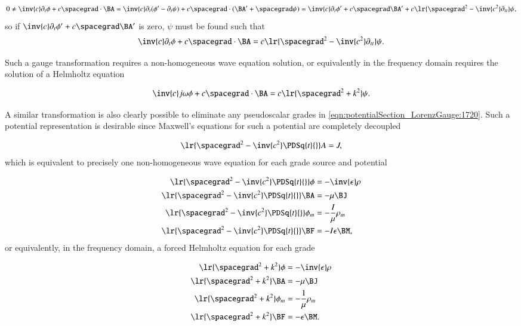 \begin{dmath}\label{eqn:potentialSection_LorenzGauge:1680}
0 \ne
\inv{c} \partial_t \phi + c \spacegrad \cdot \BA
=
\inv{c} \partial_t (\phi' - \partial_t \psi) + c \spacegrad \cdot (\BA' + \spacegrad \psi)
=
\inv{c} \partial_t \phi' + c \spacegrad \BA'
+ c \lr{ \spacegrad^2 - \inv{c^2} \partial_{tt} } \psi,
\end{dmath}
so if \( \inv{c} \partial_t \phi' + c \spacegrad \BA' \) is zero, \( \psi \) must be found such that
\begin{dmath}\label{eqn:potentialSection_LorenzGauge:1700}
\inv{c} \partial_t \phi + c \spacegrad \cdot \BA
= c \lr{ \spacegrad^2 - \inv{c^2} \partial_{tt} } \psi.
\end{dmath}

Such a gauge transformation requires a non-homogeneous wave equation solution, or equivalently in the frequency domain requires the solution of a Helmholtz equation

\begin{dmath}\label{eqn:potentialSection_LorenzGauge:1740}
\inv{c} j \omega \phi + c \spacegrad \cdot \BA
= c \lr{ \spacegrad^2 + k^2 } \psi.
\end{dmath}

A similar transformation is also clearly possible to eliminate any pseudoscalar grades in \cref{eqn:potentialSection_LorenzGauge:1720}.
Such a potential representation is desirable since
Maxwell's equations for such a potential are completely decoupled

\begin{dmath}\label{eqn:potentialSection_LorenzGauge:1760}
\lr{ \spacegrad^2 - \inv{c^2} \PDSq{t}{} } A = J,
\end{dmath}
which is equivalent to precisely one non-homogeneous wave equation for each grade source and potential

\begin{dmath}\label{eqn:potentialSection_LorenzGauge:1600}
\begin{aligned}
\lr{ \spacegrad^2 - \inv{c^2} \PDSq{t}{} } \phi &= - \inv{\epsilon} \rho \\
\lr{ \spacegrad^2 - \inv{c^2} \PDSq{t}{} } \BA &= - \mu \BJ \\
\lr{ \spacegrad^2 - \inv{c^2} \PDSq{t}{} } \phi_m &= - \frac{I}{\mu} \rho_m \\
\lr{ \spacegrad^2 - \inv{c^2} \PDSq{t}{} } \BF &= - I \epsilon \BM,
\end{aligned}
\end{dmath}
or equivalently, in the frequency domain, a forced Helmholtz equation for each grade

\begin{dmath}\label{eqn:potentialSection_LorenzGauge:1780}
\begin{aligned}
\lr{ \spacegrad^2 + k^2 } \phi &= - \inv{\epsilon} \rho \\
\lr{ \spacegrad^2 + k^2 } \BA &= - \mu \BJ \\
\lr{ \spacegrad^2 + k^2 } \phi_m &= - \frac{1}{\mu} \rho_m \\
\lr{ \spacegrad^2 + k^2 } \BF &= - \epsilon \BM.
\end{aligned}
\end{dmath}
